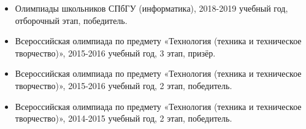 \documentclass[10pt,a4paper]{altacv}
\begin{document}
\begin{itemize}
\item Олимпиады школьников СПбГУ (информатика), 2018-2019 учебный год, отборочный этап, победитель.
\item Всероссийская олимпиада по предмету «Технология (техника и техническое творчество)», 2015-2016 учебный год, 3 этап, призёр.
\item Всероссийская олимпиада по предмету «Технология (техника и техническое творчество)», 2015-2016 учебный год, 2 этап, победитель.
\item Всероссийская олимпиада по предмету «Технология (техника и техническое творчество)», 2014-2015 учебный год, 2 этап, победитель.

\end{itemize}

\clearpage
\end{document}
